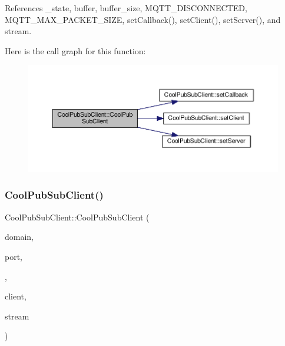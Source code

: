 References \+\_\+state, buffer, buffer\+\_\+size, M\+Q\+T\+T\+\_\+\+D\+I\+S\+C\+O\+N\+N\+E\+C\+T\+ED, M\+Q\+T\+T\+\_\+\+M\+A\+X\+\_\+\+P\+A\+C\+K\+E\+T\+\_\+\+S\+I\+ZE, set\+Callback(), set\+Client(), set\+Server(), and stream.

Here is the call graph for this function\+:\nopagebreak
\begin{figure}[H]
\begin{center}
\leavevmode
\includegraphics[width=350pt]{d8/d4b/class_cool_pub_sub_client_a2aea0a9487dc15b9db1caf0f069eb877_cgraph}
\end{center}
\end{figure}
\mbox{\label{class_cool_pub_sub_client_a6466f55abe5820d410b1c9cf7a70ec7e}} 
\subsubsection{\texorpdfstring{Cool\+Pub\+Sub\+Client()}{CoolPubSubClient()}\hspace{0.1cm}{\footnotesize\ttfamily [14/14]}}
{\footnotesize\ttfamily Cool\+Pub\+Sub\+Client\+::\+Cool\+Pub\+Sub\+Client (\begin{DoxyParamCaption}\item[{const char $\ast$}]{domain,  }\item[{uint16\+\_\+t}]{port,  }\item[{\hyperlink{class_cool_pub_sub_client_a021ec75e9fbaf658370b8005ccfddc14}{M\+Q\+T\+T\+\_\+\+C\+A\+L\+L\+B\+A\+C\+K\+\_\+\+S\+I\+G\+N\+A\+T\+U\+RE}}]{,  }\item[{Client \&}]{client,  }\item[{Stream \&}]{stream }\end{DoxyParamCaption})}



